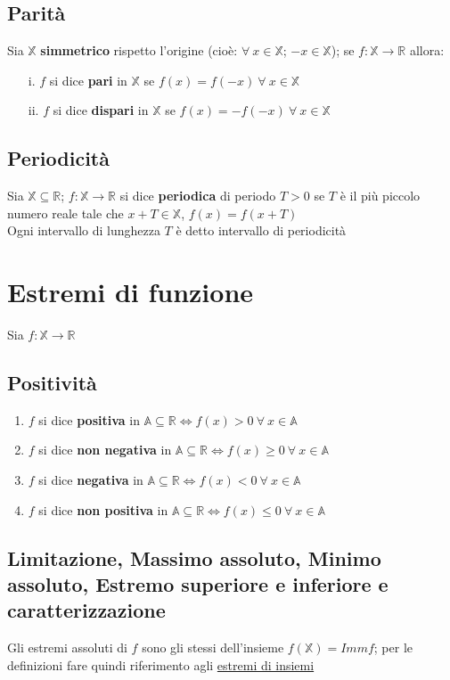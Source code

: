\subsection{Parità}
Sia $\mathbb{X}$ \textbf{simmetrico} rispetto l'origine (cioè: $\forall\ x \in \mathbb{X}$; $-x \in \mathbb{X}$); se $f: \mathbb{X} \rightarrow \mathbb{R}$ allora:
\begin{enumerate}
\item[i.] $f$ si dice \textbf{pari} in $\mathbb{X}$ se $f(x) = f(-x)\ \forall\ x \in \mathbb{X}$
\item[ii.] $f$ si dice \textbf{dispari} in $\mathbb{X}$ se $f(x) = -f(-x)\ \forall\ x \in \mathbb{X}$
\end{enumerate}

\subsection{Periodicità}
Sia $\mathbb{X} \subseteq \mathbb{R}$;   $f: \mathbb{X} \rightarrow \mathbb{R}$ si dice \textbf{periodica} di periodo $T>0$ se $T$ è il più piccolo numero reale tale che $x + T \in \mathbb{X}$, $f(x) = f(x + T)$\\
Ogni intervallo di lunghezza $T$ è detto intervallo di periodicità

\section{Estremi di funzione}
Sia $f: \mathbb{X} \rightarrow \mathbb{R}$
\subsection{Positività}
\begin{enumerate}
\item $f$ si dice \textbf{positiva} in $\mathbb{A} \subseteq \mathbb{R} \iff f(x)>0\ \forall\ x \in \mathbb{A}$
\item $f$ si dice \textbf{non negativa} in $\mathbb{A} \subseteq \mathbb{R} \iff f(x) \geq 0\ \forall\ x \in \mathbb{A}$
\item $f$ si dice \textbf{negativa} in $\mathbb{A} \subseteq \mathbb{R} \iff f(x)<0\ \forall\ x \in \mathbb{A}$
\item $f$ si dice \textbf{non positiva} in $\mathbb{A} \subseteq \mathbb{R} \iff f(x) \leq 0\ \forall\ x \in \mathbb{A}$
\end{enumerate}
\subsection{Limitazione, Massimo assoluto, Minimo assoluto, Estremo superiore e inferiore e caratterizzazione}
Gli estremi assoluti di $f$ sono gli stessi dell'insieme $f(\mathbb{X}) = Immf$; per le definizioni fare quindi riferimento agli \hyperref[sec: estremiInsiemi]{estremi di insiemi}
